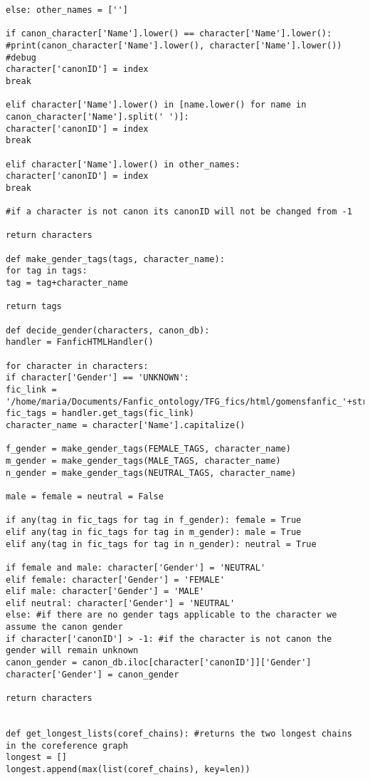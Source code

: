 \documentclass{pre-tfg}
\begin{document}
\begin{lstlisting}[style=consola]
else: other_names = ['']

if canon_character['Name'].lower() == character['Name'].lower():
#print(canon_character['Name'].lower(), character['Name'].lower()) #debug
character['canonID'] = index
break

elif character['Name'].lower() in [name.lower() for name in canon_character['Name'].split(' ')]:
character['canonID'] = index
break

elif character['Name'].lower() in other_names:
character['canonID'] = index
break

#if a character is not canon its canonID will not be changed from -1

return characters

def make_gender_tags(tags, character_name):
for tag in tags:
tag = tag+character_name

return tags

def decide_gender(characters, canon_db):
handler = FanficHTMLHandler()

for character in characters:
if character['Gender'] == 'UNKNOWN':
fic_link = '/home/maria/Documents/Fanfic_ontology/TFG_fics/html/gomensfanfic_'+str(character['ficID'])+'.html'
fic_tags = handler.get_tags(fic_link)
character_name = character['Name'].capitalize()

f_gender = make_gender_tags(FEMALE_TAGS, character_name)
m_gender = make_gender_tags(MALE_TAGS, character_name)
n_gender = make_gender_tags(NEUTRAL_TAGS, character_name)

male = female = neutral = False

if any(tag in fic_tags for tag in f_gender): female = True
elif any(tag in fic_tags for tag in m_gender): male = True
elif any(tag in fic_tags for tag in n_gender): neutral = True

if female and male: character['Gender'] = 'NEUTRAL'
elif female: character['Gender'] = 'FEMALE'
elif male: character['Gender'] = 'MALE'
elif neutral: character['Gender'] = 'NEUTRAL'
else: #if there are no gender tags applicable to the character we assume the canon gender
if character['canonID'] > -1: #if the character is not canon the gender will remain unknown
canon_gender = canon_db.iloc[character['canonID']]['Gender']
character['Gender'] = canon_gender

return characters


def get_longest_lists(coref_chains): #returns the two longest chains in the coreference graph
longest = []
longest.append(max(list(coref_chains), key=len))


\end{lstlisting}
\end{document}
